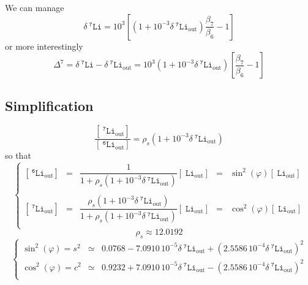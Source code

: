 \documentclass[aps,onecolumn,12pt]{revtex4}
\newcommand{\mychem}[1]{\mathtt{#1}}
\newcommand{\myconc}[1]{\left\lbrack{#1}\right\rbrack}
\newcommand{\spLi}[1]{{~^{\mychem{#1}}\mychem{Li}}}
\newcommand{\spLiOut}[1]{{\spLi{#1}}_{\mathrm{out}}}
\newcommand{\LiOut}[1]{\myconc{\spLiOut{#1}}}
\newcommand{\deltaLi}{ {\delta\!\!\!\spLi{7}} }
\newcommand{\deltaLiOut}{{\deltaLi}_{\mathrm{out}}}
\begin{document}
We can manage
\begin{equation}
	\deltaLi = 10^3 \left[ \left(1+10^{-3}\deltaLiOut\right)\dfrac{\beta_7}{\beta_6} - 1 \right] 
\end{equation}
or more interestingly
\begin{equation}
	\Delta^7 = \deltaLi - \deltaLiOut = 10^3 \left(1+10^{-3}\deltaLiOut\right) \left[\dfrac{\beta_7}{\beta_6} - 1\right]
\end{equation}

\subsection{Simplification}
\begin{equation}
	\dfrac{\LiOut{7}}{\LiOut{6}} = \rho_s \left(1+10^{-3}\deltaLiOut\right)
\end{equation}
so that
\begin{equation}
\left\lbrace
	\begin{array}{rclcl}
	\LiOut{6} & = & \dfrac{1}{1+\rho_s\left(1+10^{-3}\deltaLiOut\right)} \LiOut{} & = & \sin^2(\varphi) \LiOut{} \\
	\\
	\LiOut{7} & = & \dfrac{\rho_s\left(1+10^{-3}\deltaLiOut\right)}{1+\rho_s\left(1+10^{-3}\deltaLiOut\right)} \LiOut{} & = & \cos^2(\varphi)\LiOut{} \\
	\end{array}
\right.
\end{equation}
$$
	\rho_s \approx 12.0192
$$
\begin{equation}
\left\lbrace
	\begin{array}{rcl}
	\sin^2(\varphi) = s^2 & \simeq & 0.0768 - 7.0910\,10^{-5} \deltaLiOut + \left(2.5586\,10^{-4}\deltaLiOut\right)^2\\
	\cos^2(\varphi) = c^2 & \simeq & 0.9232 + 7.0910\,10^{-5} \deltaLiOut - \left(2.5586\,10^{-4}\deltaLiOut\right)^2\\
	\end{array}
\right.
\end{equation}
\end{document}
